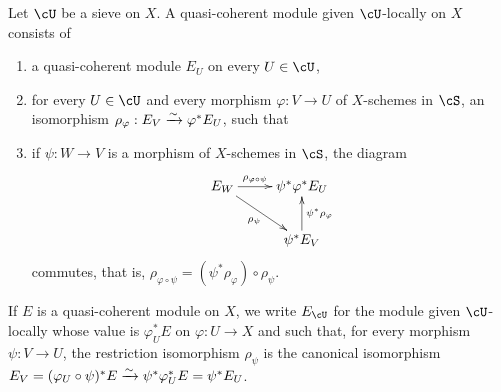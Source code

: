 \subsubsection{}\label{I:1-4-4}

Let $\cU$ be a sieve on $X$. A quasi-coherent module given
$\cU$-locally on $X$ consists of
\begin{enumerate}[\indent a)]
  \item a quasi-coherent module $E_U$ on every $U\in\cU$,
  \item for every $U\in\cU$ and every morphism $\varphi:V\to U$ of
    $X$-schemes in $\cS$, an isomorphism
    $\rho_\varphi:E_V\xrightarrow\sim\varphi^*E_U$, such that
  \item if $\psi:W\to V$ is a morphism of $X$-schemes in $\cS$, the
    diagram
    \[\xymatrix{
      E_W \ar[r]^-{\rho_{\varphi\circ\psi}} \ar[dr]_-{\rho_\psi}
        & \psi^*\varphi^* E_U \\
      & \psi^* E_V \ar[u]_-{\psi^*\rho_\varphi}
    }\]
    commutes, that is,
    $\rho_{\varphi\circ\psi}=(\psi^*\rho_\varphi)\circ\rho_\psi$.
\end{enumerate}

If $E$ is a quasi-coherent module on $X$, we write $E_\cU$ for the
module given $\cU$-locally whose value is $\varphi_U^*E$ on
$\varphi:U\to X$ and such that, for every morphism $\psi:V\to U$, the
restriction isomorphism $\rho_\psi$ is the canonical isomorphism
$E_V=(\varphi_U\circ\psi)^*E\xrightarrow\sim\psi^*\varphi_U^*E=\psi^*E_U$.

